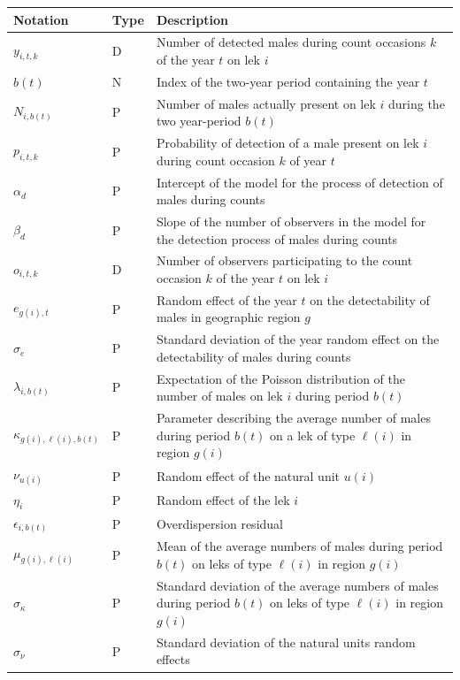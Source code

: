 \documentclass[a4paper]{article}
\newenvironment{Default Paragraph Font}{}{}
\begin{document}
\begin{tabular}{llp{12cm}}
  \hline
Notation & Type & Description \\ 
  \hline
$y_{i,t,k}$ & D & Number of detected males during count occasions $k$ of the year $t$ on lek $i$ \\ 
  $b(t)$ & N & Index of the two-year period containing the year $t$ \\ 
  $N_{i,b(t)}$ & P & Number of males actually present on lek $i$ during the two year-period $b(t)$ \\ 
  $p_{i,t,k}$ & P & Probability of detection of a male present on lek $i$ during count occasion $k$ of year $t$ \\ 
  $\alpha_d$ & P & Intercept of the model for the process of detection of males during counts \\ 
  $\beta_d$ & P & Slope of the number of observers in the model for the detection process of males during counts \\ 
  $o_{i,t,k}$ & D & Number of observers participating to the count occasion $k$ of the year $t$ on lek $i$ \\ 
  $e_{g(i),t}$ & P & Random effect of the year $t$ on the detectability of males in geographic region $g$ \\ 
  $\sigma_e$ & P & Standard deviation of the year random effect on the detectability of males during counts \\ 
  $\lambda_{i,b(t)}$ & P & Expectation of the Poisson distribution of the number of males on lek $i$ during period $b(t)$ \\ 
  $\kappa_{g(i),\ell(i),b(t)}$ & P & Parameter describing the average number of males during period $b(t)$ on a lek of type $\ell(i)$ in region $g(i)$ \\ 
  $\nu_{u(i)}$ & P & Random effect of the natural unit $u(i)$ \\ 
  $\eta_i$ & P & Random effect of the lek $i$ \\ 
  $\epsilon_{i,b(t)}$ & P & Overdispersion residual \\ 
  $\mu_{g(i),\ell(i)}$ & P & Mean of the average numbers of males during period $b(t)$ on leks of type $\ell(i)$ in region $g(i)$ \\ 
  $\sigma_{\kappa}$ & P & Standard deviation of the average numbers of males during period $b(t)$ on leks of type $\ell(i)$ in region $g(i)$ \\ 
  $\sigma_{\nu}$ & P & Standard deviation of the natural units random effects \\ 

\end{tabular}
\end{document}

